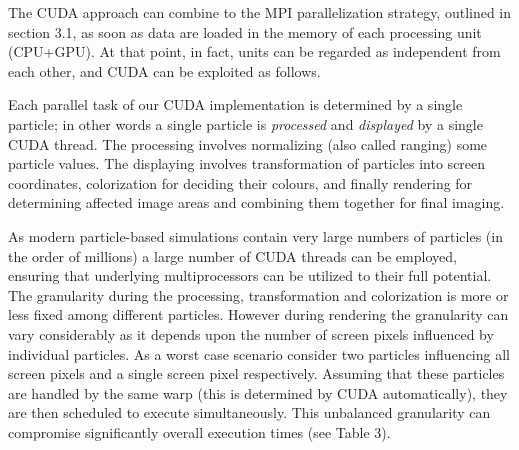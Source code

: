 

The CUDA approach can combine to the MPI parallelization strategy, outlined in 
section 3.1, as soon as data are loaded in the memory of each processing unit (CPU+GPU).
At that point, in fact, units can be regarded as independent from each other, and 
CUDA can be exploited as follows. 


Each parallel task of our CUDA implementation is determined by a single particle; in other 
words a single particle is {\it processed} and {\it displayed} by a single CUDA thread. 
The processing involves normalizing (also called ranging) some particle values. 
The displaying involves transformation of particles into screen coordinates, colorization 
for deciding their colours, and finally rendering for determining affected image
areas and combining them together for final imaging.

As modern particle-based simulations contain very large numbers of particles 
(in the order of millions) a large number of CUDA threads can be employed, 
ensuring that underlying multiprocessors can be utilized to their full potential. 
The granularity during the processing, transformation and colorization is more or 
less fixed among different particles. However during rendering the granularity 
can vary considerably as it depends upon the number of screen pixels influenced 
by individual particles. As a worst case scenario consider two particles influencing 
all screen pixels and a single screen pixel respectively. Assuming that these 
particles are handled by the same warp (this is determined by CUDA automatically), 
they are then scheduled to execute simultaneously. This unbalanced granularity 
can compromise significantly overall execution times (see Table 3).

